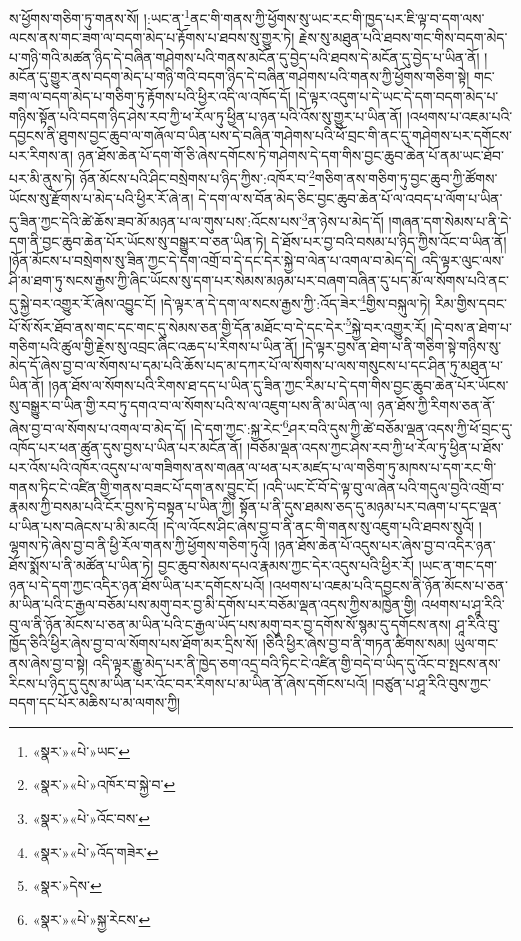 ས་ཕྱོགས་གཅིག་ཏུ་གནས་སོ། །:ཡང་ན་\footnote{«སྣར་»«པེ་»ཡང་}ནང་གི་གནས་ཀྱི་ཕྱོགས་སུ་ཡང་རང་གི་ཁྱད་པར་ཇི་ལྟ་བ་དག་ལས་ལངས་ནས་གང་ཟག་ལ་བདག་མེད་པ་རྟོགས་པ་ཐབས་སུ་གྱུར་ཏེ། རྗེས་སུ་མཐུན་པའི་ཐབས་གང་གིས་བདག་མེད་པ་གཉི་གའི་མཚན་ཉིད་དེ་བཞིན་གཤེགས་པའི་གནས་མངོན་དུ་བྱེད་པའི་ཐབས་དེ་མངོན་དུ་བྱེད་པ་ཡིན་ནོ། །
མངོན་དུ་གྱུར་ནས་བདག་མེད་པ་གཉི་གའི་བདག་ཉིད་དེ་བཞིན་གཤེགས་པའི་གནས་ཀྱི་ཕྱོགས་གཅིག་སྟེ། གང་ཟག་ལ་བདག་མེད་པ་གཅིག་ཏུ་རྟོགས་པའི་ཕྱིར་འདི་ལ་འཁོད་དོ། །དེ་ལྟར་འདུག་པ་དེ་ཡང་དེ་དག་བདག་མེད་པ་གཉིས་སྟོན་པའི་བདག་ཉིད་ཤེས་རབ་ཀྱི་ཕ་རོལ་ཏུ་ཕྱིན་པ་ཉན་པའི་འོས་སུ་གྱུར་པ་ཡིན་ནོ། །འཕགས་པ་འཇམ་པའི་དབྱངས་ནི་ཐུགས་བྱང་ཆུབ་ལ་གཞོལ་བ་ཡིན་པས་དེ་བཞིན་གཤེགས་པའི་ཕོ་བྲང་གི་ནང་དུ་གཤེགས་པར་དགོངས་པར་རིགས་ན། ཉན་ཐོས་ཆེན་པོ་དག་གོ་ཅི་ཞེས་དགོངས་ཏེ་གཤེགས་དེ་དག་གིས་བྱང་ཆུབ་ཆེན་པོ་ནམ་ཡང་ཐོབ་པར་མི་ནུས་ཏེ། ཉོན་མོངས་པའི་ཤིང་བསྲེགས་པ་ཉིད་ཀྱིས་:འཁོར་བ་\footnote{«སྣར་»«པེ་»འཁོར་བ་སྐྱེ་བ་}གཅིག་ནས་གཅིག་ཏུ་བྱང་ཆུབ་ཀྱི་ཚོགས་ཡོངས་སུ་རྫོགས་པ་མེད་པའི་ཕྱིར་རོ་ཞེ་ན། དེ་དག་ལ་ས་བོན་མེད་ཅིང་བྱང་ཆུབ་ཆེན་པོ་ལ་འབད་པ་ལོག་པ་ཡིན་དུ་ཟིན་ཀྱང་དེའི་ཚེ་ཆོས་ཟབ་མོ་མཉན་པ་ལ་གུས་པས་:འོངས་པས་\footnote{«སྣར་»«པེ་»འོང་བས་}ན་ཉེས་པ་མེད་དོ། །གཞན་དག་སེམས་པ་ནི་དེ་དག་ནི་བྱང་ཆུབ་ཆེན་པོར་ཡོངས་སུ་བསྒྱུར་བ་ཅན་ཡིན་ཏེ། དེ་ཐོས་པར་བྱ་བའི་བསམ་པ་ཉིད་ཀྱིས་འོང་བ་ཡིན་ནོ། །ཉོན་མོངས་པ་བསྲེགས་སུ་ཟིན་ཀྱང་དེ་དག་འགྲོ་བ་དེ་དང་དེར་སྐྱེ་བ་ལེན་པ་འགལ་བ་མེད་དེ། འདི་ལྟར་ལུང་ལས་ཤི་མ་ཐག་ཏུ་སངས་རྒྱས་ཀྱི་ཞིང་ཡོངས་སུ་དག་པར་སེམས་མཉམ་པར་བཞག་བཞིན་དུ་པད་མོ་ལ་སོགས་པའི་ནང་དུ་སྐྱེ་བར་འགྱུར་རོ་ཞེས་འབྱུང་ངོ། །དེ་ལྟར་ན་དེ་དག་ལ་སངས་རྒྱས་ཀྱི་:འོད་ཟེར་\footnote{«སྣར་»«པེ་»འོད་གཟེར་}གྱིས་བསྐུལ་ཏེ། རིམ་གྱིས་དབང་པོ་སོ་སོར་ཐོབ་ནས་གང་དང་གང་དུ་སེམས་ཅན་གྱི་དོན་མཐོང་བ་དེ་དང་དེར་\footnote{«སྣར་»དེས་}སྐྱེ་བར་འགྱུར་རོ། །དེ་བས་ན་ཐེག་པ་གཅིག་པའི་ཚུལ་གྱི་རྗེས་སུ་འབྲང་ཞིང་འཆད་པ་རིགས་པ་ཡིན་ནོ། །དེ་ལྟར་བྱས་ན་ཐེག་པ་ནི་གཅིག་སྟེ་གཉིས་སུ་མེད་དོ་ཞེས་བྱ་བ་ལ་སོགས་པ་དམ་པའི་ཆོས་པད་མ་དཀར་པོ་ལ་སོགས་པ་ལས་གསུངས་པ་དང་ཤིན་ཏུ་མཐུན་པ་ཡིན་ནོ། །ཉན་ཐོས་ལ་སོགས་པའི་རིགས་ཐ་དད་པ་ཡིན་དུ་ཟིན་ཀྱང་རིམ་པ་དེ་དག་གིས་བྱང་ཆུབ་ཆེན་པོར་ཡོངས་སུ་བསྒྱུར་བ་ཡིན་གྱི་རབ་ཏུ་དགའ་བ་ལ་སོགས་པའི་ས་ལ་འཇུག་པས་ནི་མ་ཡིན་ལ། ཉན་ཐོས་ཀྱི་རིགས་ཅན་ནོ་ཞེས་བྱ་བ་ལ་སོགས་པ་འགལ་བ་མེད་དོ། །དེ་དག་ཀྱང་:སྐྱ་རེང་\footnote{«སྣར་»«པེ་»སྐྱ་རེངས་}ཤར་བའི་དུས་ཀྱི་ཚེ་བཅོམ་ལྡན་འདས་ཀྱི་ཕོ་བྲང་དུ་འཁོད་པར་ཕན་ཚུན་དུས་བྱས་པ་ཡིན་པར་མངོན་ནོ། །བཅོམ་ལྡན་འདས་ཀྱང་ཤེས་རབ་ཀྱི་ཕ་རོལ་ཏུ་ཕྱིན་པ་ཐོས་པར་འོས་པའི་འཁོར་འདུས་པ་ལ་གཟིགས་ནས་གཞན་ལ་ཕན་པར་མཛད་པ་ལ་གཅིག་ཏུ་མཁས་པ་དག་རང་གི་གནས་ཏིང་ངེ་འཛིན་གྱི་གནས་བཟང་པོ་དག་ནས་བྱུང་ངོ། །འདི་ཡང་ངོ་བོ་དེ་ལྟ་བུ་ལ་ཞེན་པའི་གདུལ་བྱའི་འགྲོ་བ་རྣམས་ཀྱི་བསམ་པའི་ངོར་བྱས་ཏེ་བསྟན་པ་ཡིན་ཀྱི། སྟོན་པ་ནི་དུས་ཐམས་ཅད་དུ་མཉམ་པར་བཞག་པ་དང་ལྡན་པ་ཡིན་པས་བཞེངས་པ་མི་མངའོ། །དེ་ལ་འོངས་ཤིང་ཞེས་བྱ་བ་ནི་ནང་གི་གནས་སུ་འཇུག་པའི་ཐབས་སུའོ། །ལྷགས་ཏེ་ཞེས་བྱ་བ་ནི་ཕྱི་རོལ་གནས་ཀྱི་ཕྱོགས་གཅིག་ཏུའོ། །ཉན་ཐོས་ཆེན་པོ་འདུས་པར་ཞེས་བྱ་བ་འདིར་ཉན་ཐོས་སྨོས་པ་ནི་མཚོན་པ་ཡིན་ཏེ། བྱང་ཆུབ་སེམས་དཔའ་རྣམས་ཀྱང་དེར་འདུས་པའི་ཕྱིར་རོ། །ཡང་ན་གང་དག་ཉན་པ་དེ་དག་ཀྱང་འདིར་ཉན་ཐོས་ཡིན་པར་དགོངས་པའོ། །འཕགས་པ་འཇམ་པའི་དབྱངས་ནི་ཉོན་མོངས་པ་ཅན་མ་ཡིན་པའི་ང་རྒྱལ་བཅོམ་པས་མགུ་བར་བྱ་མི་དགོས་པར་བཅོམ་ལྡན་འདས་ཀྱིས་མཁྱེན་གྱི། འཕགས་པ་ཤཱ་རིའི་བུ་ལ་ནི་ཉོན་མོངས་པ་ཅན་མ་ཡིན་པའི་ང་རྒྱལ་ཡོད་པས་མགུ་བར་བྱ་དགོས་སོ་སྙམ་དུ་དགོངས་ནས། ཤཱ་རིའི་བུ་ཁྱོད་ཅིའི་ཕྱིར་ཞེས་བྱ་བ་ལ་སོགས་པས་ཐོག་མར་དྲིས་སོ། །ཅིའི་ཕྱིར་ཞེས་བྱ་བ་ནི་གཏན་ཚིགས་སམ། ཡུལ་གང་ནས་ཞེས་བྱ་བ་སྟེ། འདི་ལྟར་རྒྱུ་མེད་པར་ནི་ཁྱེད་ཅག་འདྲ་བའི་ཏིང་ངེ་འཛིན་གྱི་བདེ་བ་ཡིད་དུ་འོང་བ་སྤངས་ནས་རིངས་པ་ཉིད་དུ་དུས་མ་ཡིན་པར་འོང་བར་རིགས་པ་མ་ཡིན་ནོ་ཞེས་དགོངས་པའོ། །བཙུན་པ་ཤཱ་རིའི་བུས་ཀྱང་བདག་དང་པོར་མཆིས་པ་མ་ལགས་ཀྱི། 